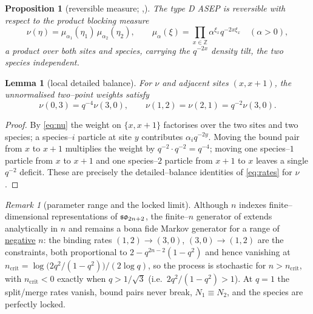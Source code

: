 \documentclass[11pt]{article}
\theoremstyle{plain}
\newtheorem{proposition}[theorem]{Proposition}
\newtheorem{lemma}[theorem]{Lemma}
\theoremstyle{definition}
\theoremstyle{remark}
\newtheorem{remark}[theorem]{Remark}
\newcommand{\Z}{\mathbb{Z}}\newcommand{\R}{\mathbb{R}}\newcommand{\N}{\mathbb{N}}
\begin{document}
\begin{proposition}[reversible measure; {\cite[Prop.~1.3]{KLLPZ}},{\cite[\S3.1]{REU}}]
\label{prop:measure}
The type D ASEP is reversible with respect to the product blocking measure
\begin{equation}\label{eq:nu}
  \nu(\eta)=\mu_{\alpha_1}(\eta_1)\,\mu_{\alpha_2}(\eta_2),\qquad
  \mu_\alpha(\xi)=\prod_{x\in\Z}\alpha^{\xi_x}q^{-2x\xi_x}\quad(\alpha>0),
\end{equation}
a product over both sites and species, carrying the $q^{-2x}$ density tilt, the two
species independent.
\end{proposition}

\begin{lemma}[local detailed balance]\label{lem:db}
For $\nu$ and adjacent sites $(x,x+1)$, the unnormalised two--point weights satisfy
\begin{equation}\label{eq:dbrel}
  \nu(0,3)=q^{-4}\nu(3,0),\qquad \nu(1,2)=\nu(2,1)=q^{-2}\nu(3,0).
\end{equation}
\end{lemma}
\begin{proof}
By \eqref{eq:nu} the weight on $\{x,x+1\}$ factorises over the two sites and two
species; a species--$i$ particle at site $y$ contributes $\alpha_i q^{-2y}$. Moving the
bound pair from $x$ to $x+1$ multiplies the weight by $q^{-2}\cdot q^{-2}=q^{-4}$;
moving one species--$1$ particle from $x$ to $x+1$ and one species--$2$ particle from
$x+1$ to $x$ leaves a single $q^{-2}$ deficit. These are precisely the
detailed--balance identities of \eqref{eq:rates} for $\nu$.
\end{proof}

\begin{remark}[parameter range and the locked limit]\label{rem:range}
Although $n$ indexes finite--dimensional representations of $\mathfrak{so}_{2n+2}$, the
finite--$n$ generator of \cite[\S2.1]{REU} extends analytically in $n$ and remains a
bona fide Markov generator for a range of \underline{negative} $n$: the binding rates
$(1,2)\to(3,0)$, $(3,0)\to(1,2)$ are the constraints, both proportional to
$2-q^{2n-2}(1-q^2)$ and hence vanishing at
$n_{\mathrm{crit}}=\log\!\big(2q^2/(1-q^2)\big)/(2\log q)$, so the process is stochastic
for $n>n_{\mathrm{crit}}$, with $n_{\mathrm{crit}}<0$ exactly when $q>1/\sqrt3$ (i.e.\
$2q^2/(1-q^2)>1$). At
$q=1$ the split/merge rates vanish, bound pairs never break, $N_1\equiv N_2$, and the
species are perfectly locked.
\end{remark}
\end{document}
